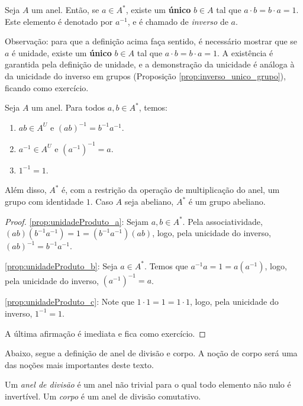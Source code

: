 \begin{definition}
    Seja $A$ um anel.
    Então, se $a \in A^*$, existe um \textbf{único} $b \in A$ tal que $a \cdot b = b \cdot a = 1$. Este elemento é denotado por $a^{-1}$, e é chamado de \emph{inverso} de $a$.
\end{definition}

Observação: para que a definição acima faça sentido, é necessário mostrar que se $a$ é unidade, existe um \textbf{único} $b \in A$ tal que $a \cdot b = b \cdot a = 1$.
A existência é garantida pela definição de unidade, e a demonstração da unicidade é análoga à da unicidade do inverso em grupos (Proposição \ref{prop:inverso_unico_grupo}), ficando como exercício.

\begin{prop}
Seja $A$ um anel. Para todos $a, b \in A^*$, temos:
\begin{enumerate}[label=\alph*)]
    \item $ab\in A^U$ e $(ab)^{-1}=b^{-1}a^{-1}$.\label{prop:unidadeProduto_a}
    \item $a^{-1}\in A^U$ e $(a^{-1})^{-1}=a$.\label{prop:unidadeProduto_b}
    \item $1^{-1}=1$.\label{prop:unidadeProduto_c}
\end{enumerate}
Além disso, $A^*$ é, com a restrição da operação de multiplicação do anel, um grupo com identidade $1$. Caso $A$ seja abeliano, $A^*$ é um grupo abeliano.
\end{prop}
\begin{proof}
    \ref{prop:unidadeProduto_a}: Sejam $a, b \in A^*$. Pela associatividade, $(ab)(b^{-1}a^{-1})=1=(b^{-1}a^{-1})(ab)$, logo, pela unicidade do inverso, $(ab)^{-1}=b^{-1}a^{-1}$.

    \ref{prop:unidadeProduto_b}: Seja $a \in A^*$. Temos que $a^{-1}a=1=a(a^{-1})$, logo, pela unicidade do inverso, $(a^{-1})^{-1}=a$.

    \ref{prop:unidadeProduto_c}: Note que $1\cdot 1=1=1\cdot 1$, logo, pela unicidade do inverso, $1^{-1}=1$.

    A última afirmação é imediata e fica como exercício.
\end{proof}

Abaixo, segue a definição de anel de divisão e corpo.
A noção de corpo será uma das noções mais importantes deste texto.
\begin{definition}
Um \emph{anel de divisão} é um anel não trivial para o qual todo elemento não nulo é invertível.
Um \emph{corpo} é um anel de divisão comutativo.
\end{definition}

